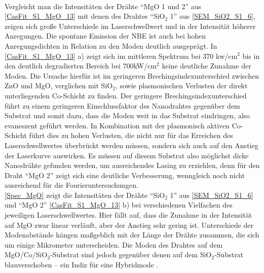 \\
Vergleicht man die Intensitäten der Drähte ``MgO 1 und 2'' aus \autoref{CasFit_S1_MgO_13} mit denen des Drahtes ``SiO$_\text{2}$ 1'' aus \autoref{SEM_SiO2_S1_6}, zeigen sich große Unterschiede im Laserschwellwert und in der Intensität höherer Anregungen. Die spontane Emission der NBE ist auch bei hohen Anregungsdichten in Relation zu den Moden deutlich ausgeprägt. In \autoref{CasFit_S1_MgO_13} a) zeigt sich im mittleren Spektrum bei 370 kw/cm$^\text{2}$ bis in den deutlich degradierten Bereich bei 700kW/cm$^\text{2}$ keine deutliche Zunahme der Moden. Die Ursache hierfür ist im geringeren Brechingsindexunterschied zwischen ZnO und MgO, verglichen mit SiO$_\text{2}$, sowie plasmonischen Verlusten der direkt unterliegenden Co-Schicht zu finden. Der geringere Brechingsindexunterschied führt zu einem geringeren Einschlussfaktor des Nanodrahtes gegenüber dem Substrat und somit dazu, dass die Moden weit in das Substrat eindringen, also evaneszent geführt werden. In Kombination mit der plasmonisch aktiven Co-Schicht führt dies zu hohen Verlusten, die nicht nur für das Erreichen des Laserschwellwertes überbrückt werden müssen, sondern sich auch auf den Anstieg der Laserkurve auswirken. Es müssen auf diesem Substrat also möglichst dicke Nanodrähte gefunden werden, um ausreichendes Lasing zu erziehlen, denn für den Draht ``MgO 2'' zeigt sich eine deutliche Verbesserung, wenngleich noch nicht ausreichend für die Fourieruntersuchungen.\\
\autoref{Spec_MgO} zeigt die Intensitäten der Drähte ``SiO$_\text{2}$ 1'' aus \autoref{SEM_SiO2_S1_6} und ``MgO 2'' \autoref{CasFit_S1_MgO_13} b) bei verschiedenen Vielfachen des jeweiligen Laserschwellwertes. Hier fällt auf, dass die Zunahme in der Intensität auf MgO zwar linear verläuft, aber der Anstieg sehr gering ist. Unterschiede der Modenabstände hängen maßgeblich mit der Länge der Drähte zusammen, die sich um einige Mikrometer unterscheiden. Die Moden des Drahtes auf dem  MgO/Co/SiO$_\text{2}$-Substrat sind jedoch gegenüber denen auf dem SiO$_\text{2}$-Substrat blauverschoben – ein Indiz für eine Hybridmode \cite{Sidiropoulos.2014}.
\\
